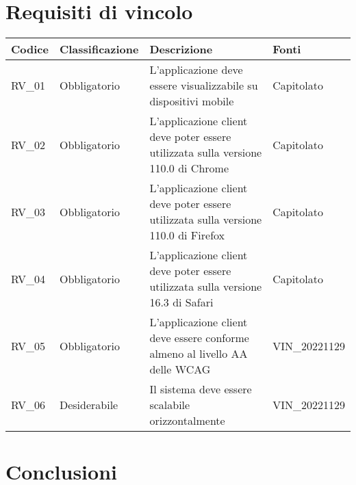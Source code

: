 \section{Requisiti di vincolo}

\begin{center}
    \begin{xltabular}{\linewidth}{|l|l|X|l|}
    \hline
    \textbf{Codice} & \textbf{Classificazione} & \textbf{Descrizione} & \textbf{Fonti} \\
    \hline
    RV\_01 & Obbligatorio & L'applicazione deve essere visualizzabile su dispositivi mobile & Capitolato \\

    \hline
    RV\_02 & Obbligatorio & L'applicazione client deve poter essere utilizzata sulla versione 110.0 di Chrome  & Capitolato \\

    \hline
    RV\_03 & Obbligatorio & L'applicazione client deve poter essere utilizzata sulla versione 110.0 di Firefox  & Capitolato \\

    \hline
    RV\_04 & Obbligatorio & L'applicazione client deve poter essere utilizzata sulla versione 16.3 di Safari  & Capitolato \\

    \hline
    RV\_05 & Obbligatorio & L'applicazione client deve essere conforme almeno al livello AA delle WCAG  & VIN\_20221129 \\

    \hline
    RV\_06 & Desiderabile & Il sistema deve essere scalabile orizzontalmente  & VIN\_20221129 \\

    \hline

    \end{xltabular}
    \end{center}

\section{Conclusioni}